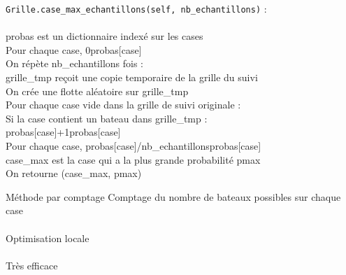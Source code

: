 {
\begin{frame}[allowframebreaks]
\texttt{Grille.case\_max\_echantillons(self, nb\_echantillons)} :\\~\\
probas est un dictionnaire indexé sur les cases\\
Pour chaque case, 0\sto probas[case]\\
On répète nb\_echantillons fois :\\
grille\_tmp reçoit une copie temporaire de la grille du suivi\\
On crée une flotte aléatoire sur grille\_tmp\\
Pour chaque case vide dans la grille de suivi originale :\\
Si la case contient un bateau dans grille\_tmp :\\
probas[case]+1\sto probas[case]\\
Pour chaque case, probas[case]/nb\_echantillons\sto probas[case]\\
case\_max est la case qui a la plus grande probabilité pmax\\
On retourne (case\_max, pmax)\\
\end{frame}
}

\begin{frame}{Méthode par comptage}
Comptage du nombre de bateaux possibles sur chaque case\\~\\ \pause
Optimisation locale\\~\\ \pause
Très efficace 
\end{frame}

